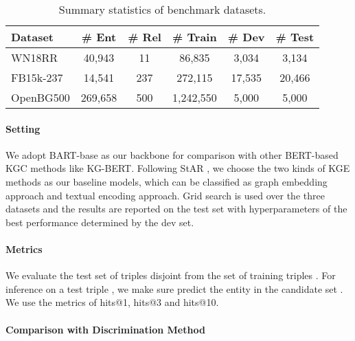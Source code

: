 \documentclass[sigconf]{acmart}
\begin{document}
\begin{table}[!htbp]\small
\caption{\small Summary statistics of benchmark datasets.}
\renewcommand\tabcolsep{4.0pt}
	\centering
	\begin{tabular}{lccccc}
		\toprule
		\textbf{Dataset}   & \textbf{\# Ent}  & \textbf{\# Rel} & \textbf{\# Train} & \textbf{\# Dev} & \textbf{\# Test} \\
		\midrule
		WN18RR    & 40,943  & 11    & 86,835   & 3,034  & 3,134   \\
		FB15k-237 & 14,541  & 237   & 272,115  & 17,535 & 20,466  \\ 
		OpenBG500  & 269,658  & 500   & 1,242,550  & 5,000  & 5,000 \\
		\bottomrule
	\end{tabular}
	\label{tb:dataset}
\end{table} 
\paragraph{Setting}
We adopt BART-base as our backbone for comparison with other BERT-based KGC methods like KG-BERT.
Following StAR \cite{STAR}, we choose the two kinds of KGE methods as our baseline models, which can be classified as graph embedding approach and textual encoding approach.
Grid search is used over the three datasets and the results are reported on the test set with hyperparameters of the best performance determined by the dev set.


\paragraph{Metrics}
We evaluate the test set of triples  disjoint from the set of training triples .
For inference on a test triple , we make sure predict the entity in the candidate set .
We use the metrics of hits@1, hits@3 and hits@10.



\paragraph{Comparison with Discrimination Method}



    

\newcommand{\progressbar}[2][2cm]{\textcolor{color1}{\rule{#1 * \real{#2} / 100}{1.5ex}}\textcolor{color2!15}{\rule{#1 - #1 * \real{#2} / 100}{1.5ex}}}
\end{document}
